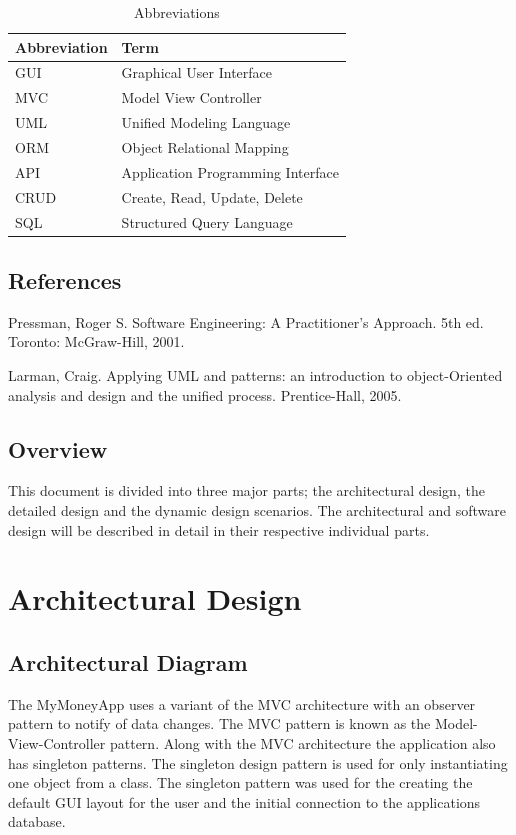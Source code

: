 \documentclass[12pt]{article}
\begin{document}
\begin{table}[H]
\caption{Abbreviations}
\begin{center}
\begin{tabular}{|p{3cm}|p{12cm}|}
\hline
Abbreviation & Term \\
\hline\hline
GUI & Graphical User Interface  \\
\hline
MVC & Model View Controller \\
\hline
UML & Unified Modeling Language \\
\hline
ORM & Object Relational Mapping \\
\hline
API & Application Programming Interface \\
\hline
CRUD & Create, Read, Update, Delete \\
\hline
SQL & Structured Query Language \\
\hline

\end{tabular}
\end{center}
\end{table}


\subsection{References}

Pressman, Roger S. Software Engineering: A Practitioner's Approach. 5th ed. Toronto: McGraw-Hill, 2001. 

Larman, Craig. Applying UML and patterns: an introduction to object-Oriented analysis and design and the unified process. Prentice-Hall, 2005.


\subsection{Overview}
This document is divided into three major parts; the architectural design, the detailed design and the dynamic design scenarios. The architectural and software design will be described in detail in their respective individual parts.


\section{Architectural Design}

\subsection{Architectural Diagram}
The MyMoneyApp uses a variant of the MVC architecture with an observer pattern to notify of data changes. The MVC pattern is known as the Model-View-Controller pattern.  Along with the MVC architecture the application also has singleton patterns. The singleton design pattern is used for only instantiating one object from a class. The singleton pattern was used for the creating the default GUI layout for the user and the initial connection to the applications database. 
\end{document}
